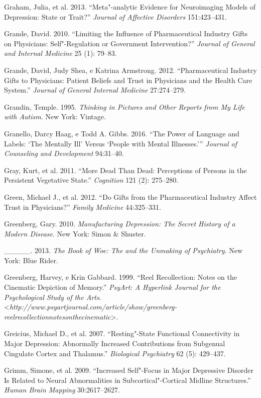 {\begin{Parskip}
Graham, Julia, et al. 2013. ``Meta"-analytic Evidence for Neuroimaging
Models of Depression: State or Trait?'' \emph{Journal of Affective
Disorders} 151:423--431.

Grande, David. 2010. ``Limiting the Influence of Pharmaceutical Industry
Gifts on Physicians: Self"-Regulation or Government Intervention?''
\emph{Journal of General and Internal Medicine} 25 (1): 79--83.

Grande, David, Judy Shea, e Katrina Armstrong. 2012. ``Pharmaceutical
Industry Gifts to Physicians: Patient Beliefs and Trust in Physicians
and the Health Care System.'' \emph{Journal of General Internal
Medicine} 27:274--279.

Grandin, Temple. 1995. \emph{Thinking in Pictures and Other Reports from
My Life with Autism}. New York: Vintage.

Granello, Darcy Haag, e Todd A. Gibbs. 2016. ``The Power of Language and
Labels: `The Mentally Ill' Versus `People with Mental Illnesses.'''
\emph{Journal of Counseling and Development} 94:31--40.

Gray, Kurt, et al. 2011. ``More Dead Than Dead: Perceptions of Persons
in the Persistent Vegetative State.'' \emph{Cognition} 121 (2):
275--280.

Green, Michael J., et al. 2012. ``Do Gifts from the Pharmaceutical
Industry Affect Trust in Physicians?'' \emph{Family Medicine}
44:325--331.

Greenberg, Gary. 2010. \emph{Manufacturing Depression: The Secret
History of a Modern Disease}. New York: Simon \& Shuster.

\_\_\_\_\_. 2013. \emph{The Book of Woe: The  and the Unmaking of
Psychiatry}. New York: Blue Rider.

Greenberg, Harvey, e Krin Gabbard. 1999. ``Reel Recollection: Notes on
the Cinematic Depiction of Memory.'' \emph{PsyArt: A Hyperlink Journal
for the Psychological Study of the Arts}.
\textless{}\emph{http://www.psyartjournal.com/article/show/greenberg-reelrecollectionnotesonthecinematic}\textgreater{}.

Greicius, Michael D., et al. 2007. ``Resting"-State Functional
Connectivity in Major Depression: Abnormally Increased Contributions
from Subgenual Cingulate Cortex and Thalamus.'' \emph{Biological
Psychiatry} 62 (5): 429--437.

Grimm, Simone, et al. 2009. ``Increased Self"-Focus in Major Depressive
Disorder Is Related to Neural Abnormalities in Subcortical"-Cortical
Midline Structures.'' \emph{Human Brain Mapping} 30:2617--2627.


\end{Parskip}}
